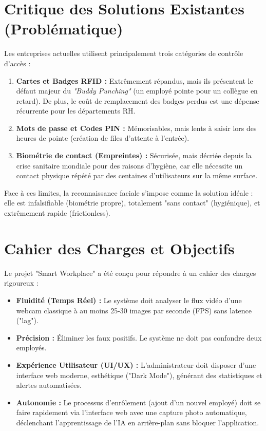 \documentclass[12pt,a4paper]{report}
\begin{document}
\section{Critique des Solutions Existantes (Problématique)}
Les entreprises actuelles utilisent principalement trois catégories de contrôle d'accès :
\begin{enumerate}
    \item \textbf{Cartes et Badges RFID :} Extrêmement répandus, mais ils présentent le défaut majeur du \textit{"Buddy Punching"} (un employé pointe pour un collègue en retard). De plus, le coût de remplacement des badges perdus est une dépense récurrente pour les départements RH.
    \item \textbf{Mots de passe et Codes PIN :} Mémorisables, mais lents à saisir lors des heures de pointe (création de files d'attente à l'entrée).
    \item \textbf{Biométrie de contact (Empreintes) :} Sécurisée, mais décriée depuis la crise sanitaire mondiale pour des raisons d'hygiène, car elle nécessite un contact physique répété par des centaines d'utilisateurs sur la même surface.
\end{enumerate}

Face à ces limites, la reconnaissance faciale s'impose comme la solution idéale : elle est infalsifiable (biométrie propre), totalement "sans contact" (hygiénique), et extrêmement rapide (frictionless).

\section{Cahier des Charges et Objectifs}
Le projet "Smart Workplace" a été conçu pour répondre à un cahier des charges rigoureux :
\begin{itemize}
    \item \textbf{Fluidité (Temps Réel) :} Le système doit analyser le flux vidéo d'une webcam classique à au moins 25-30 images par seconde (FPS) sans latence ("lag").
    \item \textbf{Précision :} Éliminer les faux positifs. Le système ne doit pas confondre deux employés.
    \item \textbf{Expérience Utilisateur (UI/UX) :} L'administrateur doit disposer d'une interface web moderne, esthétique ("Dark Mode"), générant des statistiques et alertes automatisées.
    \item \textbf{Autonomie :} Le processus d'enrôlement (ajout d'un nouvel employé) doit se faire rapidement via l'interface web avec une capture photo automatique, déclenchant l'apprentissage de l'IA en arrière-plan sans bloquer l'application.
\end{itemize}
\end{document}
